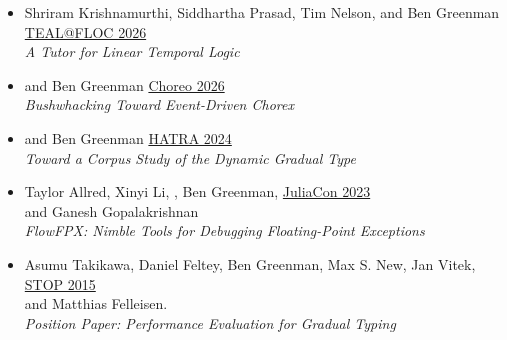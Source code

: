 \documentclass[11pt]{article}
\begin{document}
\begin{itemize}
  \item
    Shriram Krishnamurthi, Siddhartha Prasad, Tim Nelson, and Ben Greenman \hfill \href{https://teal.cs.brown.edu/floc2026/}{TEAL@FLOC 2026} \\
    \emph{A Tutor for Linear Temporal Logic}
  \item
     and Ben Greenman \hfill \href{https://pldi26.sigplan.org/home/cp-2026}{Choreo 2026} \\
    \emph{Bushwhacking Toward Event-Driven Chorex}
  \item
     and Ben Greenman \hfill \href{https://2024.splashcon.org/home/hatra-2024}{HATRA 2024} \\
      \emph{Toward a Corpus Study of the Dynamic Gradual Type}
  \item
    Taylor Allred, Xinyi Li, , Ben Greenman, \hfill \href{https://juliacon.org/2023/}{JuliaCon 2023} \\
     and Ganesh Gopalakrishnan  \\
     \emph{FlowFPX: Nimble Tools for Debugging Floating-Point Exceptions}
  \item
    Asumu Takikawa, Daniel Feltey, Ben Greenman, Max S. New, Jan Vitek, \hfill \href{https://2015.ecoop.org/track/STOP2015}{STOP 2015} \\
     and Matthias Felleisen. \\
     \emph{Position Paper: Performance Evaluation for Gradual Typing}
\end{itemize}
\end{document}
